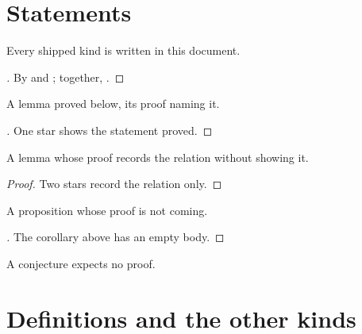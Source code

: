 \flmHeading[toc=true]
\section{Statements}{\flmLabels{}}

\begin{theorem}\flmLabels{\label{ref1}}
Every shipped kind is written in this document.
\end{theorem}

\begin{proof}[{}]
By  and ; together, .
\end{proof}

\begin{lemma}\flmLabels{\label{ref2}}
A lemma proved below, its proof naming it.
\end{lemma}

\begin{proof}[{}]
One star shows the statement proved.
\end{proof}

\begin{lemma}\flmLabels{\label{ref3}}
A lemma whose proof records the relation without showing it.
\end{lemma}

\begin{proof}
Two stars record the relation only.
\end{proof}

\begin{proposition}\flmLabels{\label{ref4}}\noproofref A proposition whose proof is not coming.
\end{proposition}

\begin{corollary}\flmLabels{\label{ref5}}
\end{corollary}

\begin{proof}[{}]
The corollary above has an empty body.
\end{proof}

\begin{conjecture}\flmLabels{\label{ref6}}
A conjecture expects no proof.
\end{conjecture}

\flmHeading[toc=true]
\section{Definitions and the other kinds}{\flmLabels{}}

